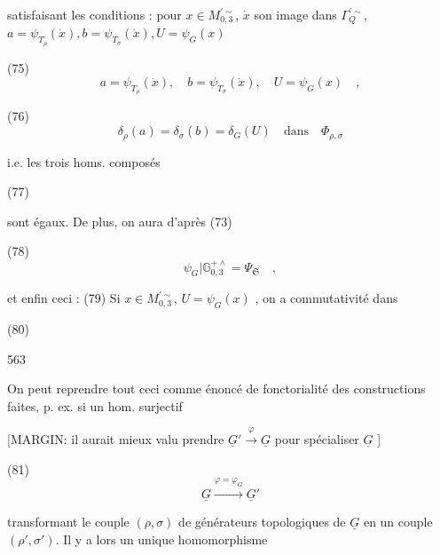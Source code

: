 \begin{enumerate}
satisfaisant les conditions : pour $x \in M_{0,3}^{\prime \sim}$, $\dot{x}$ son image dans $\Gamma_Q^{\prime \sim}$,
~~$a = \psi_{T_\rho}(\dot{x}), b = \psi_{T_\sigma}(\dot{x}), U = \psi_G(x)$~~

(75)
$$ a = \psi_{T_\rho}(\dot{x}), \quad b = \psi_{T_\sigma}(\dot{x}), \quad U = \psi_G(x) \quad , $$

(76)
$$ \delta_\rho(a) = \delta_\sigma(b) = \delta_G(U) \quad \text{dans} \quad \Phi_{\rho,\sigma} $$

i.e. les trois homs. composés

(77)

sont égaux. De plus, on aura d'après (73)

(78)
$$ \psi_G | \mathbb{G}_{0,3}^{+ \wedge} = \Psi_{\mathfrak{S}} \quad , $$

et enfin ceci :
(79) Si $x \in M_{0,3}^{\prime \sim}$, $U = \psi_G(x)$ , on a 
commutativité dans

(80)

\newpage


563

On peut reprendre tout ceci comme
énoncé de fonctorialité des constructions
faites, p. ex. si un hom. surjectif

[MARGIN: 
il aurait
mieux valu
prendre
$\underline{G}' \xrightarrow{\varphi} \underline{G}$
pour
spécialiser
$\underline{G}$
]

(81) $$ \underline{G} \xrightarrow{\varphi = \varphi_{\underline{G}}} \underline{G}' $$

transformant le couple $(\rho, \sigma)$ de générateurs
topologiques de $\underline{G}$ en un couple $(\rho', \sigma')$.
Il y a lors un unique homomorphisme


\end{enumerate}
